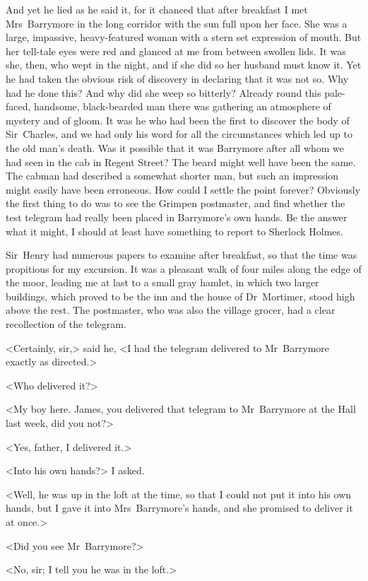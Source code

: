 And yet he lied as he said it, for it chanced that after breakfast I met Mrs~Barrymore in the long corridor with the sun full upon her face. She was a large, impassive, heavy-featured woman with a stern set expression of mouth. But her tell-tale eyes were red and glanced at me from between swollen lids. It was she, then, who wept in the night, and if she did so her husband must know it. Yet he had taken the obvious risk of discovery in declaring that it was not so. Why had he done this? And why did she weep so bitterly? Already round this pale-faced, handsome, black-bearded man there was gathering an atmosphere of mystery and of gloom. It was he who had been the first to discover the body of Sir~Charles, and we had only his word for all the circumstances which led up to the old man's death. Was it possible that it was Barrymore after all whom we had seen in the cab in Regent Street? The beard might well have been the same. The cabman had described a somewhat shorter man, but such an impression might easily have been erroneous. How could I settle the point forever? Obviously the first thing to do was to see the Grimpen postmaster, and find whether the test telegram had really been placed in Barrymore's own hands. Be the answer what it might, I should at least have something to report to Sherlock Holmes.

Sir~Henry had numerous papers to examine after breakfast, so that the time was propitious for my excursion. It was a pleasant walk of four miles along the edge of the moor, leading me at last to a small gray hamlet, in which two larger buildings, which proved to be the inn and the house of Dr~Mortimer, stood high above the rest. The postmaster, who was also the village grocer, had a clear recollection of the telegram.

<Certainly, sir,> said he, <I had the telegram delivered to Mr~Barrymore exactly as directed.>

<Who delivered it?>

<My boy here. James, you delivered that telegram to Mr~Barrymore at the Hall last week, did you not?>

<Yes, father, I delivered it.>

<Into his own hands?> I asked.

<Well, he was up in the loft at the time, so that I could not put it into his own hands, but I gave it into Mrs~Barrymore's hands, and she promised to deliver it at once.>

<Did you see Mr~Barrymore?>

<No, sir; I tell you he was in the loft.>

